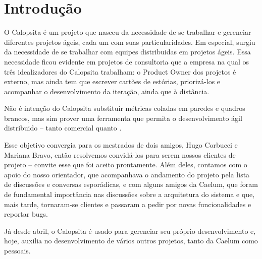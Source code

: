 \section{Introdução}
O Calopsita é um projeto que nasceu da necessidade de se trabalhar e gerenciar diferentes projetos ágeis, cada um com suas particularidades. Em especial, surgiu da necessidade de se trabalhar com equipes distribuidas em projetos ágeis. Essa necessidade ficou evidente em projetos de consultoria que a empresa na qual os três idealizadores do Calopsita trabalham: o Product Owner dos projetos é externo, mas ainda tem que escrever cartões de estórias, priorizá-los e acompanhar o desenvolvimento da iteração, ainda que à distância.

Não é intenção do Calopsita substituir métricas coladas em paredes e quadros brancos, mas sim prover uma ferramenta que permita o desenvolvimento ágil distribuido -- tanto comercial quanto \opensource.  

Esse objetivo convergia para os mestrados de dois amigos, Hugo Corbucci e Mariana Bravo, então resolvemos convidá-los para serem nossos clientes de projeto -- convite esse que foi aceito prontamente. Além deles, contamos com o apoio do nosso orientador, que acompanhava o andamento do projeto pela lista de discussões e conversas esporádicas, e com alguns amigos da Caelum, que foram de fundamental importância nas discussões sobre a arquitetura do sistema e que, mais tarde, tornaram-se clientes e passaram a pedir por novas funcionalidades e reportar bugs. 

Já desde abril, o Calopsita é usado para gerenciar seu próprio desenvolvimento e, hoje, auxilia no desenvolvimento de vários outros projetos, tanto da Caelum como pessoais.


